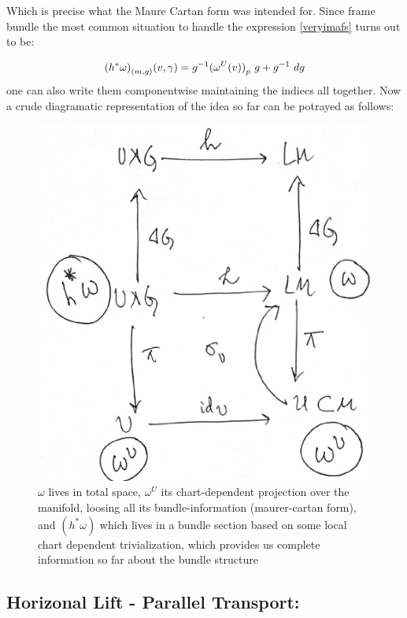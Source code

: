 \documentclass[8pt, twocoloumn]{article}
\begin{document}
Which is precise what the Maure Cartan form was intended for. Since frame bundle the most common situation to handle the expression \ref{veryimafs} turns out to be:

\begin{align}{\label{localyangmillsfield}}
    {(h^{*}\omega)}_{(m,g)}(v, \gamma) = g^{-1} {(\omega^{U}(v))}_{p} \ g+ g^{-1} \ dg
\end{align}
one can also write them componentwise maintaining the indiecs all together. Now a crude diagramatic representation of the idea so far can be potrayed as follows: 

\begin{figure}[h!]
\begin{center}
\includegraphics[scale = 0.1]{connection.jpg}
\caption{$\omega$ lives in total space, $\omega^{U}$ its chart-dependent projection over the manifold, loosing all its bundle-information (maurer-cartan form), and ${(h^{*}\omega)}$ which lives in a bundle section based on some local chart dependent trivialization, which provides us complete information so far about the bundle structure}
\end{center}
\end{figure}

\subsection{Horizonal Lift - Parallel Transport:} 
\end{document}
